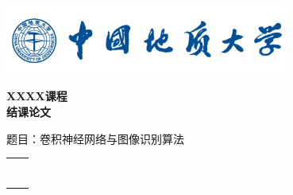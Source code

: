 \documentclass[10pt]{ctexart}
\begin{document}
	\begin{titlepage}
		\vspace*{-2cm}
		\flushleft
		\includegraphics[width=0.7\textwidth]{figs/CUGB_fig}\\
		\vspace{3.5cm}
		\begin{center}
			\textbf{\li\yihao XXXX课程\\[5pt]结课论文}
		\end{center}
		\vspace{3cm}
		\begin{center}
			\erhao \hei \parbox[t]{12cm}%
			{题目：卷积神经网络与图像识别算法}
		\end{center}
		\vspace{2cm}
		\begin{center}
			\song\sihao
			\renewcommand\arraystretch{1.5}
			\begin{tabular}{p{2cm}c}
				\makebox[2em][l]{学\qquad 院：} & \underline{\makebox[15em][c]{XX学院}} \\
				\makebox[2em][l]{班\qquad 级：} & \underline{\makebox[15em][c]{10XXXXXX}} \\
				\makebox[2em][l]{学\qquad 号：} & \underline{\makebox[15em][c]{10XXXXXXXX}} \\
				\makebox[2em][l]{姓\qquad 名：} &
				\underline{\makebox[15em][c]{XXX}}\\
				\makebox[2em][l]{导\qquad 师：} &
				\underline{\makebox[15em][c]{XXX}}\\
				\makebox[2em][l]{成\qquad 绩：} & \underline{\makebox[15em][c]{ }} \\
				\makebox[2em][l]{时\qquad 间：} & \underline{\makebox[15em][c]{\today}} \\
			\end{tabular}
			
			\vspace{3cm}
			
		\end{center}
	\end{titlepage}
	
	
	
	
	
	\xiaosihao
	\tableofcontents%
	\thispagestyle{empty}
	\clearpage
	
	\setcounter{page}{1}
	
\end{document}
